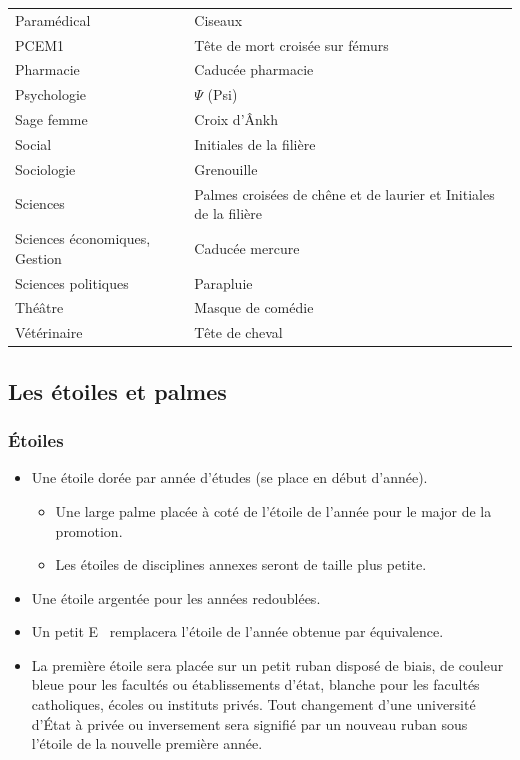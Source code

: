 \begin{center}
\begin{tabularx}{\textwidth}{l X}
Paramédical                           & Ciseaux\\
PCEM1                                 & Tête de mort croisée sur fémurs\\
Pharmacie                             & Caducée pharmacie\\
Psychologie                           & $\Psi$ (Psi)\\
Sage femme                            & Croix d'Ânkh\\
Social                                & Initiales de la filière\\
Sociologie                            & Grenouille\\
Sciences                              & Palmes croisées de chêne et de laurier et
                                     Initiales de la filière\\
Sciences économiques, Gestion         & Caducée mercure\\
Sciences politiques                   & Parapluie\\
Théâtre                               & Masque de comédie\\
Vétérinaire                           & Tête de cheval\\
\end{tabularx}
\end{center}


\subsection{Les étoiles et palmes}

\subsubsection*{Étoiles}
\begin{itemize}
\item Une étoile dorée par année d'études (se place en début d'année).
	\begin{itemize}
	\item Une large palme placée à coté de l'étoile de l'année pour le major de la promotion.
	\item Les étoiles de disciplines annexes seront de taille plus petite.
	\end{itemize}

\item Une étoile argentée pour les années redoublées.

\item Un petit  \og E\fg~ remplacera l'étoile de l'année obtenue par équivalence.


\item La première étoile sera placée sur un petit ruban disposé de biais, de couleur bleue
pour les facultés ou établissements d'état, blanche pour les facultés catholiques, écoles ou
instituts privés. Tout changement d'une université d'État à privée ou inversement sera
signifié par un nouveau ruban sous l'étoile de la nouvelle première année.
\end{itemize}

